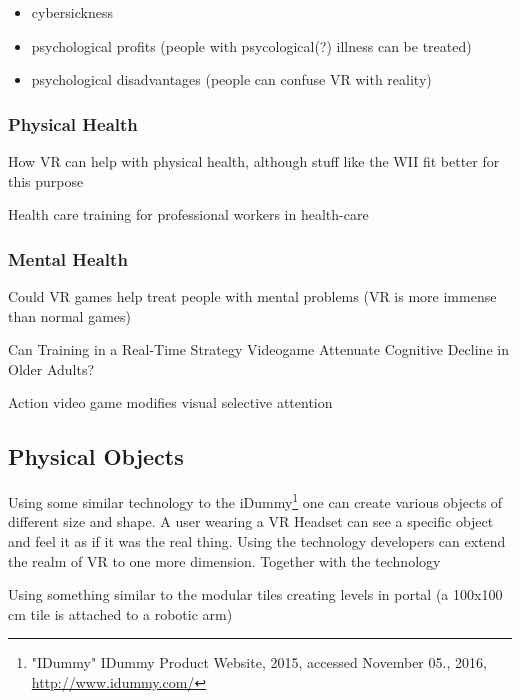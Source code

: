 \begin{itemize}
	\item cybersickness
	\item psychological profits (people with psycological(?) illness can be treated)
	\item psychological disadvantages (people can confuse VR with reality)
\end{itemize}

\subsubsection{Physical Health}
How VR can help with physical health, although stuff like the WII fit better for this purpose

Health care training for professional workers in health-care

\subsubsection{Mental Health}
Could VR games help treat people with mental problems (VR is more immense than normal games)

Can Training in a Real-Time Strategy Videogame Attenuate Cognitive Decline in Older Adults?

Action video game modifies visual selective attention

\subsection{Physical Objects}

Using some similar technology to the iDummy\footnote{"IDummy" IDummy Product Website, 2015, accessed November 05., 2016, \url{http://www.idummy.com/}} one can create various objects of different size and shape. A user wearing a VR Headset can see a specific object and feel it as if it was the real thing. Using the technology developers can extend the realm of VR to one more dimension. Together with the technology~\cite{Azmandian:2016:HRD:2858036.2858226}

Using something similar to the modular tiles creating levels in portal (a 100x100 cm tile is attached to a robotic arm)

